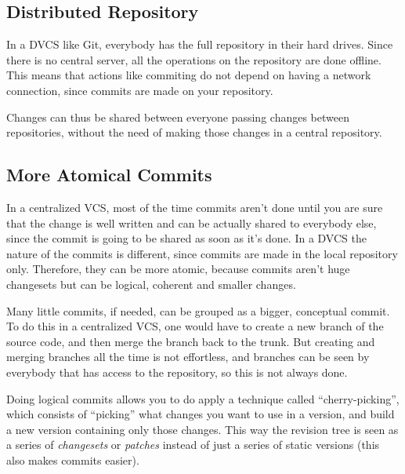 \documentclass[%
	final,
	notitlepage,
	narroweqnarray,
	inline,
	twoside,
	]{ieee}
\begin{document}
\subsection {Distributed Repository}

In a DVCS like Git, everybody has the full repository in their hard drives.
Since there is no central server, all the operations on the repository are done 
offline. This means that actions like commiting do not depend on having a 
network connection, since commits are made on your repository.

Changes can thus be shared between everyone passing changes between repositories, 
without the need of making those changes in a central repository.



\subsection{More Atomical Commits}

In a centralized VCS, most of the time commits aren't done until you are sure that 
the change is well written and can be actually shared to everybody else, since the 
commit is going to be shared as soon as it's done. In a DVCS the nature of the commits 
is different, since commits are made in the local repository only. Therefore, they can be more atomic, 
because commits aren't huge changesets but can be logical, coherent and smaller changes. 

Many little commits, if needed, can be grouped as a bigger, conceptual commit.
To do this in a centralized VCS, one would have to create a new branch of the source code, 
and then merge the branch back to the trunk. But creating and merging branches all the time is 
not effortless, and branches can be seen by everybody that has access to the repository, 
so this is not always done.

Doing logical commits allows you to do apply a technique called ``cherry-picking'', 
which consists of ``picking'' what changes you want to use in a version, and build 
a new version containing only those changes. This way the revision tree is seen as a 
series of \emph{changesets} or \emph{patches} instead of just a series of static versions
(this also makes commits easier).
\end{document}
